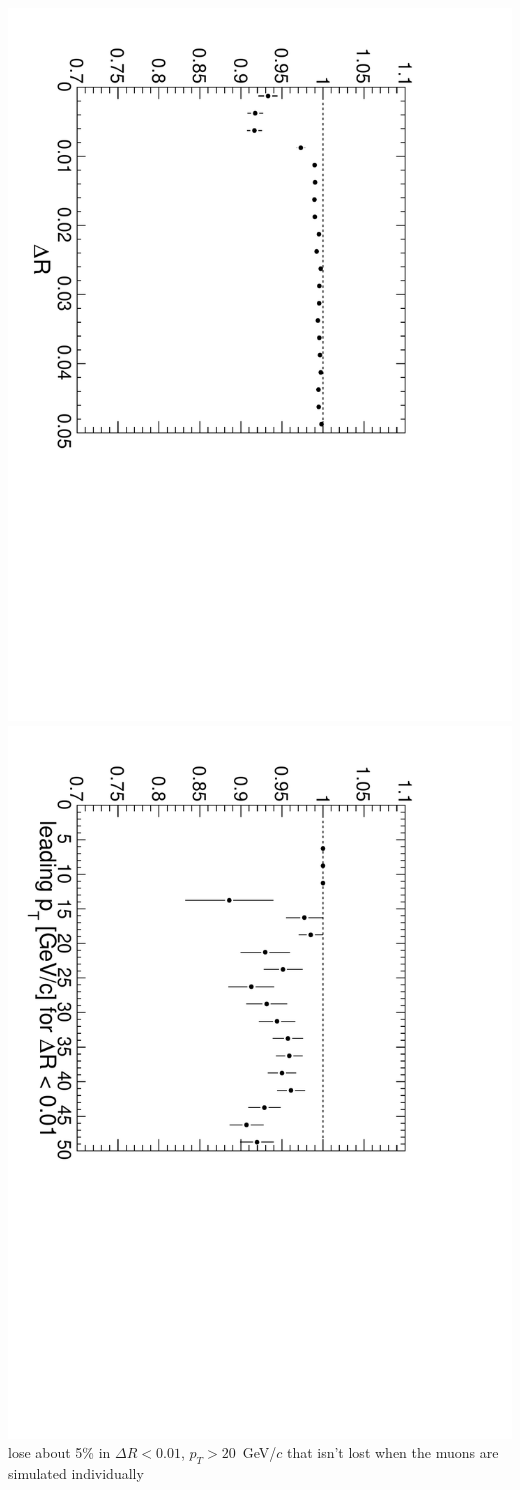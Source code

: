 \documentclass[compress]{beamer}
\begin{document}
\begin{frame}
\vspace{-0.25 cm}
\begin{columns}
\includegraphics[height=\linewidth, angle=90]{doubleeff_deltar.pdf}
\includegraphics[height=\linewidth, angle=90]{doubleeff_leadpt.pdf}
\scriptsize 
lose about 5\% in $\Delta R < 0.01$, $p_{T} > 20$~GeV/$c$ that isn't lost when the muons are simulated individually
\end{columns}
\end{frame}
\end{document}
